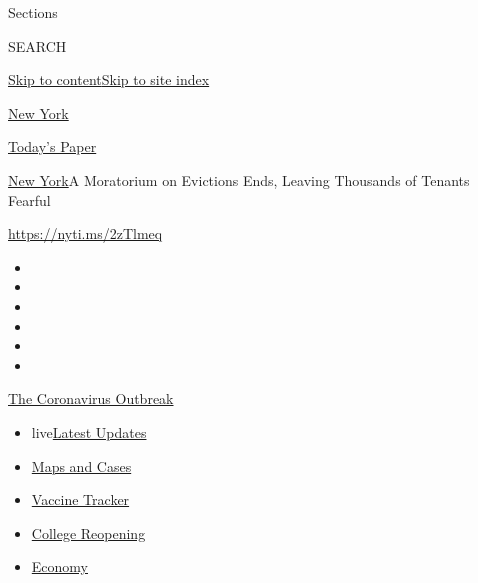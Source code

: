 Sections

SEARCH

\protect\hyperlink{site-content}{Skip to
content}\protect\hyperlink{site-index}{Skip to site index}

\href{https://www.nytimes.com/section/nyregion}{New York}

\href{https://myaccount.nytimes.com/auth/login?response_type=cookie\&client_id=vi}{}

\href{https://www.nytimes.com/section/todayspaper}{Today's Paper}

\href{/section/nyregion}{New York}\textbar{}A Moratorium on Evictions
Ends, Leaving Thousands of Tenants Fearful

\url{https://nyti.ms/2zTlmeq}

\begin{itemize}
\item
\item
\item
\item
\item
\item
\end{itemize}

\href{https://www.nytimes.com/news-event/coronavirus?action=click\&pgtype=Article\&state=default\&region=TOP_BANNER\&context=storylines_menu}{The
Coronavirus Outbreak}

\begin{itemize}
\tightlist
\item
  live\href{https://www.nytimes.com/2020/08/03/world/coronavirus-covid-19.html?action=click\&pgtype=Article\&state=default\&region=TOP_BANNER\&context=storylines_menu}{Latest
  Updates}
\item
  \href{https://www.nytimes.com/interactive/2020/us/coronavirus-us-cases.html?action=click\&pgtype=Article\&state=default\&region=TOP_BANNER\&context=storylines_menu}{Maps
  and Cases}
\item
  \href{https://www.nytimes.com/interactive/2020/science/coronavirus-vaccine-tracker.html?action=click\&pgtype=Article\&state=default\&region=TOP_BANNER\&context=storylines_menu}{Vaccine
  Tracker}
\item
  \href{https://www.nytimes.com/2020/08/02/us/covid-college-reopening.html?action=click\&pgtype=Article\&state=default\&region=TOP_BANNER\&context=storylines_menu}{College
  Reopening}
\item
  \href{https://www.nytimes.com/live/2020/08/03/business/stock-market-today-coronavirus?action=click\&pgtype=Article\&state=default\&region=TOP_BANNER\&context=storylines_menu}{Economy}
\end{itemize}

